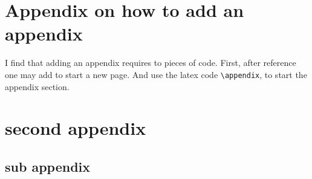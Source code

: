 \documentclass[
  11pts,
]{article}
\begin{document}
\newpage{}

\appendix

\section{Appendix on how to add an
appendix}\label{appendix-on-how-to-add-an-appendix}

I find that adding an appendix requires to pieces of code. First, after
reference one may add \texttt{} to start a new page. And use the latex
code \texttt{\textbackslash{}appendix}, to start the appendix section.

\section{second appendix}\label{second-appendix}

\subsection{sub appendix}\label{sub-appendix}
\end{document}
